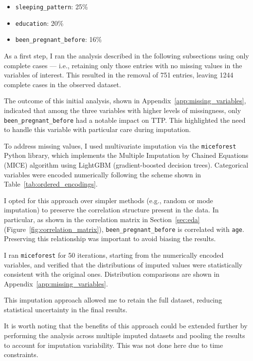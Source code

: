 \documentclass[11pt]{article}
\begin{document}
\begin{itemize}
    \item \texttt{sleeping\_pattern}: 25\%
    \item \texttt{education}: 20\%
    \item \texttt{been\_pregnant\_before}: 16\%
\end{itemize}

As a first step, I ran the analysis described in the following subsections using only complete cases — i.e., retaining only those entries with no missing values in the variables of interest. This resulted in the removal of 751 entries, leaving 1244 complete cases in the observed dataset.

The outcome of this initial analysis, shown in Appendix~\ref{app:missing_variables}, indicated that among the three variables with higher levels of missingness, only \texttt{been\_pregnant\_before} had a notable impact on TTP. This highlighted the need to handle this variable with particular care during imputation.

To address missing values, I used multivariate imputation via the \texttt{miceforest} Python library, which implements the Multiple Imputation by Chained Equations (MICE) algorithm using LightGBM (gradient-boosted decision trees). Categorical variables were encoded numerically following the scheme shown in Table~\ref{tab:ordered_encodings}.

I opted for this approach over simpler methods (e.g., random or mode imputation) to preserve the correlation structure present in the data. In particular, as shown in the correlation matrix in Section~\ref{sec:eda} (Figure~\ref{fig:correlation_matrix}), \texttt{been\_pregnant\_before} is correlated with \texttt{age}. Preserving this relationship was important to avoid biasing the results.

I ran \texttt{miceforest} for 50 iterations, starting from the numerically encoded variables, and verified that the distributions of imputed values were statistically consistent with the original ones. Distribution comparisons are shown in Appendix~\ref{app:missing_variables}.

This imputation approach allowed me to retain the full dataset, reducing statistical uncertainty in the final results.

It is worth noting that the benefits of this approach could be extended further by performing the analysis across multiple imputed datasets and pooling the results to account for imputation variability. This was not done here due to time constraints.
\end{document}
